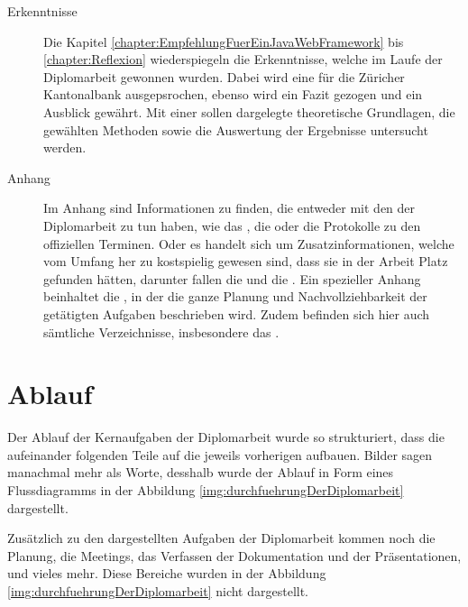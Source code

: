 \begin{description}
  \item[Erkenntnisse]
  
  Die Kapitel \ref{chapter:EmpfehlungFuerEinJavaWebFramework} bis
  \ref{chapter:Reflexion} wiederspiegeln die Erkenntnisse, welche im Laufe
  der Diplomarbeit gewonnen wurden. Dabei wird eine
   für die Züricher
  Kantonalbank ausgepsrochen, ebenso wird ein Fazit gezogen und ein Ausblick
  gewährt. Mit einer  sollen dargelegte
  theoretische Grundlagen, die gewählten Methoden sowie die Auswertung der
  Ergebnisse untersucht werden.
  
  \item[Anhang]
  
  Im Anhang sind Informationen zu finden, die entweder mit den
   der Diplomarbeit zu tun haben, wie das
  , die 
  oder die Protokolle zu den offiziellen Terminen. Oder es handelt sich um
  Zusatzinformationen, welche vom Umfang her zu kostspielig gewesen sind, dass
  sie in der Arbeit Platz gefunden hätten, darunter fallen die
   und die
  . Ein spezieller Anhang
  beinhaltet die , in der die ganze
  Planung und Nachvollziehbarkeit der getätigten Aufgaben beschrieben wird.
  Zudem befinden sich hier auch sämtliche Verzeichnisse, insbesondere das
  \bibname.
  
  \end{description}
  
  \clearpage
  
  \section{Ablauf}

  Der Ablauf der Kernaufgaben der Diplomarbeit wurde so strukturiert, dass die
  aufeinander folgenden Teile auf die jeweils vorherigen aufbauen. Bilder sagen
  manachmal mehr als Worte, desshalb wurde der Ablauf in Form eines
  Flussdiagramms in der Abbildung \ref{img:durchfuehrungDerDiplomarbeit}
  dargestellt.
  
  Zusätzlich zu den dargestellten Aufgaben der Diplomarbeit kommen noch
  die Planung, die Meetings, das Verfassen der Dokumentation und der
  Präsentationen, und vieles mehr. Diese Bereiche wurden in der Abbildung
  \ref{img:durchfuehrungDerDiplomarbeit} nicht dargestellt.
  \newline
  
